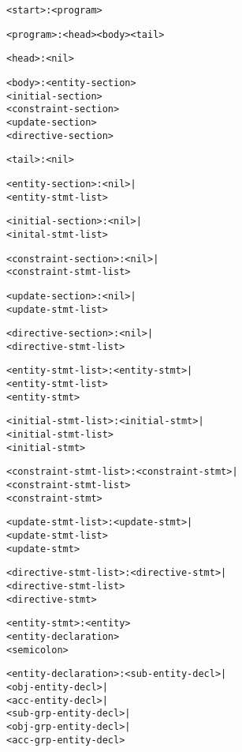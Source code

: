 \documentclass[11pt]{report}
\newenvironment{vverbatim}
{
  \begin{alltt}
}
{
    \vspace{-\baselineskip}
  \end{alltt}
}
\begin{document}
      \begin{vverbatim}
<start>                  : <program>

<program>                : <head> <body> <tail>

<head>                   : <nil>

<body>                   : <entity-section>
                           <initial-section>
                           <constraint-section>
                           <update-section>
                           <directive-section>

<tail>                   : <nil>

<entity-section>         : <nil> |
                           <entity-stmt-list>

<initial-section>        : <nil> |
                           <inital-stmt-list>

<constraint-section>     : <nil> |
                           <constraint-stmt-list>

<update-section>         : <nil> |
                           <update-stmt-list>

<directive-section>      : <nil> |
                           <directive-stmt-list>

<entity-stmt-list>       : <entity-stmt> |
                           <entity-stmt-list>
                           <entity-stmt>

<initial-stmt-list>      : <initial-stmt> |
                           <initial-stmt-list>
                           <initial-stmt>

<constraint-stmt-list>   : <constraint-stmt> |
                           <constraint-stmt-list>
                           <constraint-stmt>

<update-stmt-list>       : <update-stmt> |
                           <update-stmt-list>
                           <update-stmt>

<directive-stmt-list>    : <directive-stmt> |
                           <directive-stmt-list>
                           <directive-stmt>

<entity-stmt>            : <entity>
                           <entity-declaration>
                           <semicolon>

<entity-declaration>     : <sub-entity-decl> |
                           <obj-entity-decl> |
                           <acc-entity-decl> |
                           <sub-grp-entity-decl> |
                           <obj-grp-entity-decl> |
                           <acc-grp-entity-decl>


\end{vverbatim}
\end{document}
